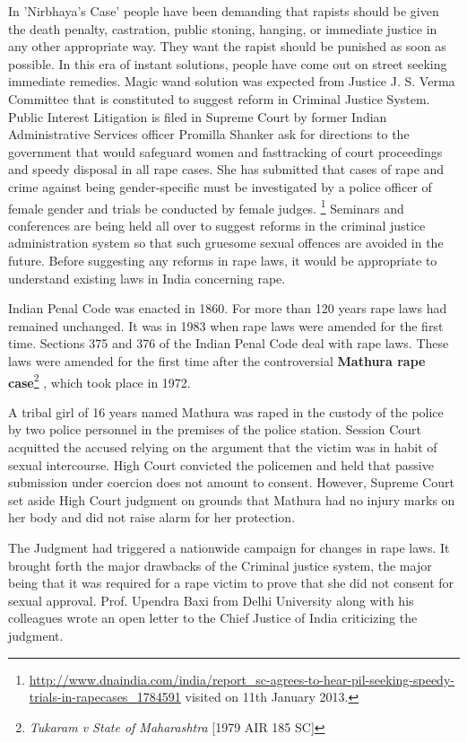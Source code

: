 \begin{multicols}{2}
\noi
In 'Nirbhaya's Case' people have been demanding that rapists should be given the death
penalty, castration, public stoning, hanging, or immediate justice in any other
appropriate way. They want the rapist should be punished as soon as possible. In this era of instant solutions, people have come out on street seeking immediate remedies.
Magic wand solution was expected from Justice J. S. Verma Committee that is
constituted to suggest reform in Criminal Justice System. Public Interest Litigation is
filed in Supreme Court by former Indian Administrative Services officer Promilla
Shanker ask for directions to the government that would safeguard women and fasttracking of court proceedings and speedy disposal in all rape cases. She has submitted
that cases of rape and crime against being gender-specific must be investigated by a
police officer of female gender and trials be conducted by female judges.
\footnote{\url{http://www.dnaindia.com/india/report_sc-agrees-to-hear-pil-seeking-speedy-trials-in-rapecases_1784591} visited on 11th January 2013.} Seminars
and conferences are being held all over to suggest reforms in the criminal justice
administration system so that such gruesome sexual offences are avoided in the future.
Before suggesting any reforms in rape laws, it would be appropriate to understand
existing laws in India concerning rape. 


\noi
Indian Penal Code was enacted in 1860. For more than 120 years rape laws had
remained unchanged. It was in 1983 when rape laws were amended for the first time.
Sections 375 and 376 of the Indian Penal Code deal with rape laws. These laws were
amended for the first time after the controversial {\bf Mathura rape case}\footnote{{\it Tukaram v State of Maharashtra} [1979 AIR 185 SC]}
, which took place
in 1972.

\noi
A tribal girl of 16 years named Mathura was raped in the custody of the police by two
police personnel in the premises of the police station. Session Court acquitted the
accused relying on the argument that the victim was in habit of sexual intercourse. High
Court convicted the policemen and held that passive submission under coercion does
not amount to consent. However, Supreme Court set aside High Court judgment on
grounds that Mathura had no injury marks on her body and did not raise alarm for her
protection.

\noi
The Judgment had triggered a nationwide campaign for changes in rape laws. It brought
forth the major drawbacks of the Criminal justice system, the major being that it was
required for a rape victim to prove that she did not consent for sexual approval. Prof. Upendra Baxi from Delhi University along with his colleagues wrote an open letter to
the Chief Justice of India criticizing the judgment.


\end{multicols}
